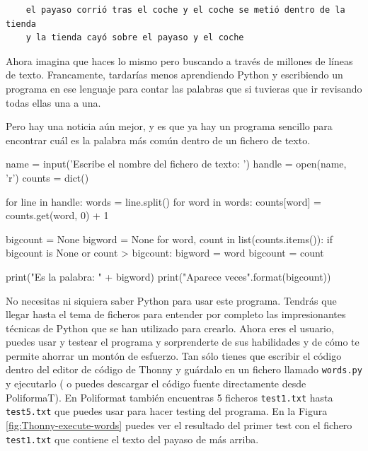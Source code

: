 \begin{verbatim}
    el payaso corrió tras el coche y el coche se metió dentro de la tienda
    y la tienda cayó sobre el payaso y el coche
\end{verbatim}

Ahora imagina que haces lo mismo pero buscando a través de millones de
líneas de texto. Francamente, tardarías menos aprendiendo Python y
escribiendo un programa en ese lenguaje para contar las palabras que si
tuvieras que ir revisando todas ellas una a una.

Pero hay una noticia aún mejor, y es que ya hay un programa sencillo para encontrar cuál es la palabra más común dentro de un fichero de texto. 

\begin{python}
name = input('Escribe el nombre del fichero de texto: ')
handle = open(name, 'r')
counts = dict()

for line in handle:
    words = line.split()
    for word in words:
        counts[word] = counts.get(word, 0) + 1

bigcount = None
bigword = None
for word, count in list(counts.items()):
    if bigcount is None or count > bigcount:
        bigword = word
        bigcount = count

print("Es la palabra: " + bigword)
print("Aparece {} veces".format(bigcount))
\end{python}


No necesitas ni siquiera saber Python para usar este programa. Tendrás
que llegar hasta el tema de ficheros para entender por completo
las impresionantes técnicas de Python que se han utilizado para crearlo.
Ahora eres el usuario, puedes usar y testear el programa y
sorprenderte de sus habilidades y de cómo te permite ahorrar un montón de esfuerzo. Tan sólo tienes que escribir el código dentro del editor de código de Thonny y guárdalo en un fichero llamado \verb|words.py| y ejecutarlo ( o puedes descargar el código
fuente directamente desde PoliformaT). En Poliformat también encuentras 5 ficheros \verb|test1.txt| hasta \verb|test5.txt| que puedes usar para hacer testing del programa. En la Figura \ref{fig:Thonny-execute-words} puedes ver el resultado del primer test con el fichero \verb|test1.txt| que contiene el texto del payaso de más arriba.

